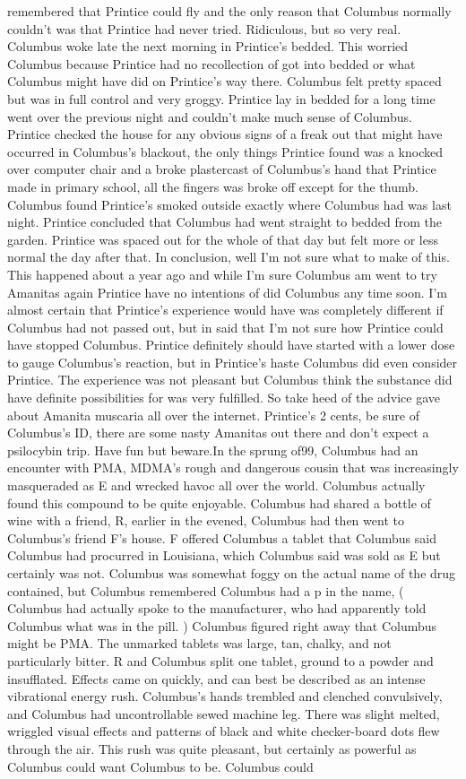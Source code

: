\documentclass[12pt]{book}
\begin{document}
remembered that Printice could fly and the only reason that Columbus normally couldn't was that Printice had never tried. Ridiculous, but so very real. Columbus woke late the next morning in Printice's bedded. This worried Columbus because Printice had no recollection of got into bedded or what Columbus might have did on Printice's way there. Columbus felt pretty spaced but was in full control and very groggy. Printice lay in bedded for a long time went over the previous night and couldn't make much sense of Columbus. Printice checked the house for any obvious signs of a freak out that might have occurred in Columbus's blackout, the only things Printice found was a knocked over computer chair and a broke plastercast of Columbus's hand that Printice made in primary school, all the fingers was broke off except for the thumb. Columbus found Printice's smoked outside exactly where Columbus had was last night. Printice concluded that Columbus had went straight to bedded from the garden. Printice was spaced out for the whole of that day but felt more or less normal the day after that. In conclusion, well I'm not sure what to make of this. This happened about a year ago and while I'm sure Columbus am went to try Amanitas again Printice have no intentions of did Columbus any time soon. I'm almost certain that Printice's experience would have was completely different if Columbus had not passed out, but in said that I'm not sure how Printice could have stopped Columbus. Printice definitely should have started with a lower dose to gauge Columbus's reaction, but in Printice's haste Columbus did even consider Printice. The experience was not pleasant but Columbus think the substance did have definite possibilities for was very fulfilled. So take heed of the advice gave about Amanita muscaria all over the internet. Printice's 2 cents, be sure of Columbus's ID, there are some nasty Amanitas out there and don't expect a psilocybin trip. Have fun but beware.In the sprung of99, Columbus had an encounter with PMA, MDMA's rough and dangerous cousin that was increasingly masqueraded as E and wrecked havoc all over the world. Columbus actually found this compound to be quite enjoyable. Columbus had shared a bottle of wine with a friend, R, earlier in the evened, Columbus had then went to Columbus's friend F's house. F offered Columbus a tablet that Columbus said Columbus had procurred in Louisiana, which Columbus said was sold as E but certainly was not. Columbus was somewhat foggy on the actual name of the drug contained, but Columbus remembered Columbus had a p in the name, ( Columbus had actually spoke to the manufacturer, who had apparently told Columbus what was in the pill. ) Columbus figured right away that Columbus might be PMA. The unmarked tablets was large, tan, chalky, and not particularly bitter. R and Columbus split one tablet, ground to a powder and insufflated. Effects came on quickly, and can best be described as an intense vibrational energy rush. Columbus's hands trembled and clenched convulsively, and Columbus had uncontrollable sewed machine leg. There was slight melted, wriggled visual effects and patterns of black and white checker-board dots flew through the air. This rush was quite pleasant, but certainly as powerful as Columbus could want Columbus to be. Columbus could 
\end{document}
